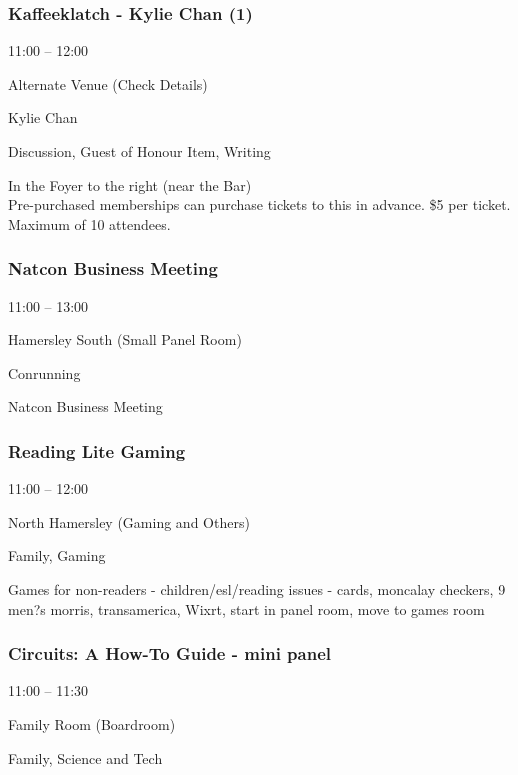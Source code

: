 \documentclass{scrreprt}
\begin{document}
\begin{multicols}{2}
\subsubsection*{Kaffeeklatch - Kylie Chan (1)}\begin{description}
\setlength{\itemsep}{0pt}
\setlength{\parsep}{0pt}
\setlength{\parskip}{0pt}
\item[Time:]{11:00 -- 12:00}
\item[Venue:]{Alternate Venue (Check Details)}
\item[People:]{Kylie Chan}
\item[Tags:]{Discussion, Guest of Honour Item, Writing}\end{description}
In the Foyer to the right (near the Bar) \\Pre-purchased memberships can purchase tickets to this in advance. \$5 per ticket. Maximum of 10 attendees.
\subsubsection*{Natcon Business Meeting}\begin{description}
\setlength{\itemsep}{0pt}
\setlength{\parsep}{0pt}
\setlength{\parskip}{0pt}
\item[Time:]{11:00 -- 13:00}
\item[Venue:]{Hamersley South (Small Panel Room)}
\item[Tags:]{Conrunning}\end{description}
Natcon Business Meeting
\subsubsection*{Reading Lite Gaming}\begin{description}
\setlength{\itemsep}{0pt}
\setlength{\parsep}{0pt}
\setlength{\parskip}{0pt}
\item[Time:]{11:00 -- 12:00}
\item[Venue:]{North Hamersley (Gaming and Others)}
\item[Tags:]{Family, Gaming}\end{description}
Games for non-readers - children/esl/reading issues - cards, moncalay checkers, 9 men?s morris, transamerica, Wixrt, start in panel room, move to games room
\subsubsection*{Circuits: A How-To Guide - mini panel}\begin{description}
\setlength{\itemsep}{0pt}
\setlength{\parsep}{0pt}
\setlength{\parskip}{0pt}
\item[Time:]{11:00 -- 11:30}
\item[Venue:]{Family Room (Boardroom)}
\item[Tags:]{Family, Science and Tech}\end{description}


\end{multicols}
\end{document}
